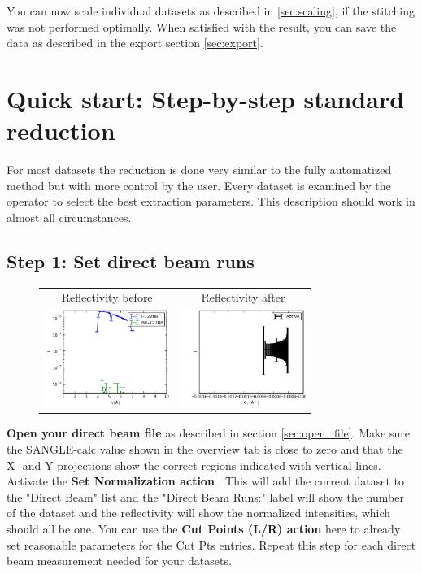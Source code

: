   
  You can now scale individual datasets as described in \ref{sec:scaling}, if the stitching was not performed optimally.
  When satisfied with the result, you can save the data as described in the export section \ref{sec:export}.
  
\clearpage
\section{Quick start: Step-by-step standard reduction}
\label{sec:quick_start}
  For most datasets the reduction is done very similar to the fully automatized method but with more control by the user.
  Every dataset is examined by the operator to select the best extraction parameters. This description should work in
  almost all circumstances.
  
  \subsection{Step 1: Set direct beam runs}
    \begin{figure}
    \begin{tabular}{cc}
        Reflectivity before & Reflectivity after \\
      \includegraphics[width=115pt]{screenshots/normalize3.png} & \includegraphics[width=115pt]{screenshots/normalize_after.png}
    \end{tabular}     
    \end{figure}
  
        \textbf{Open your direct beam file} as described in section \ref{sec:open_file}. 
      Make sure the SANGLE-calc value shown in the overview tab is close to zero and that the X- and Y-projections show the correct regions indicated with vertical lines.
      Activate the \textbf{Set Normalization action} . 
      This will add the current dataset to the "Direct Beam" list and the "Direct Beam Runs:" label will show the number of the dataset and the reflectivity will show the normalized intensities, which should all be one. 
      You can use the \textbf{Cut Points (L/R) action}  here to already set reasonable parameters for the Cut Pts entries.
      Repeat this step for each direct beam measurement needed for your datasets.

